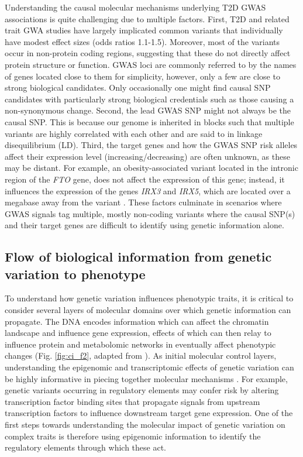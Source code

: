 Understanding the causal molecular mechanisms underlying T2D GWAS associations is quite challenging due to multiple factors. First, T2D and related trait GWA studies have largely implicated common variants that individually have modest effect sizes (odds ratios 1.1-1.5). Moreover, most of the variants occur in non-protein coding regions, suggesting that these do not directly affect protein structure or function. GWAS loci are commonly referred to by the names of genes located close to them for simplicity, however, only a few are close to strong biological candidates. Only occasionally one might find causal SNP candidates with particularly strong biological credentials such as those causing a non-synonymous change.  Second, the lead GWAS SNP might not always be the causal SNP. This is because our genome is inherited in blocks such that multiple variants are highly correlated with each other and are said to in linkage disequilibrium (LD). Third, the target genes and how the GWAS SNP risk alleles affect their expression level (increasing/decreasing) are often unknown, as these may be distant. For example, an obesity-associated variant located in the intronic region of the \textit{FTO} gene, does not affect the expression of this gene; instead, it influences the expression of the genes \textit{IRX3} and \textit{IRX5}, which are located over a megabase away from the variant \cite{claussnitzerFTOObesityVariant2015}. These factors culminate in scenarios where GWAS signals tag multiple, mostly non-coding variants where the causal SNP(s) and their target genes are difficult to identify using genetic information alone.    
                                                                             
\subsection{Flow of biological information from genetic variation to phenotype} 
To understand how genetic variation influences phenotypic traits, it is critical to consider several layers of molecular domains over which genetic information can propagate. The DNA encodes information which can affect the chromatin landscape and influence gene expression, effects of which can then relay to influence protein and metabolomic networks in eventually affect phenotypic changes (Fig. \ref{fig:ci_f2}, adapted from \cite{civelekSystemsGeneticsApproaches2014}). As initial molecular control layers, understanding the epigenomic and transcriptomic effects of genetic variation can be highly informative in piecing together molecular mechanisms \cite{kyonoGenomicAnnotationDiseaseassociated2019}. For example, genetic variants occurring in regulatory elements may confer risk by altering transcription factor binding sites that propagate signals from upstream transcription factors to influence downstream target gene expression. One of the first steps towards understanding the molecular impact of genetic variation on complex traits is therefore using epigenomic information to identify the regulatory elements through which these act. 


